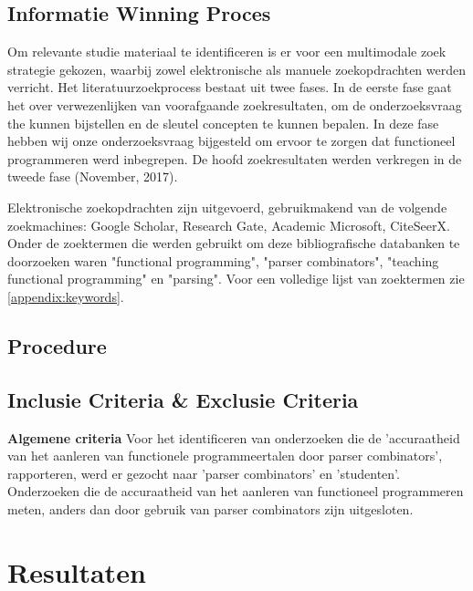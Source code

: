\documentclass[twoside,twocolumn]{article}
\begin{document}
\subsection{Informatie Winning Proces}
Om relevante studie materiaal te identificeren is er voor een multimodale
zoek strategie gekozen, waarbij zowel elektronische als manuele zoekopdrachten
werden verricht. Het literatuurzoekprocess bestaat uit twee fases. In de eerste
fase gaat het over verwezenlijken van voorafgaande zoekresultaten, om de
onderzoeksvraag the kunnen bijstellen en de sleutel concepten te kunnen
bepalen. In deze fase hebben wij onze onderzoeksvraag bijgesteld om ervoor te
zorgen dat functioneel programmeren werd inbegrepen. De hoofd zoekresultaten
werden verkregen in de tweede fase (November, 2017).

Elektronische zoekopdrachten zijn uitgevoerd, gebruikmakend van de volgende
zoekmachines: Google Scholar, Research Gate, Academic Microsoft, CiteSeerX.
Onder de zoektermen die werden gebruikt om deze bibliografische databanken te
doorzoeken waren  "functional programming", "parser combinators",
"teaching functional programming" en "parsing". Voor een volledige lijst van
zoektermen zie \cref{appendix:keywords}.

\subsection{Procedure}
\blindtext

\subsection{Inclusie Criteria \& Exclusie Criteria}
\textbf{Algemene criteria} \quad Voor het identificeren van onderzoeken die
de 'accuraatheid van het aanleren van functionele programmeertalen door parser
combinators', rapporteren, werd er gezocht naar 'parser combinators' en
'studenten'. Onderzoeken die de accuraatheid van het aanleren van
functioneel programmeren meten, anders dan door gebruik van parser combinators
zijn uitgesloten.



\section{Resultaten}
\end{document}
